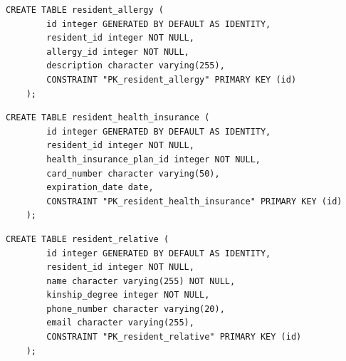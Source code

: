 \begin{quadro}[H]
	\caption[Script SQL --- Tabela \texttt{resident\_allergy}]{Script SQL --- Tabela \texttt{resident\_allergy}}
	\label{quadro:script-resident-allergy}
	
	\begin{minipage}{0.96\textwidth}
		\begin{lstlisting}[style=academic-sql]
	CREATE TABLE resident_allergy (
		id integer GENERATED BY DEFAULT AS IDENTITY,
		resident_id integer NOT NULL,
		allergy_id integer NOT NULL,
		description character varying(255),
		CONSTRAINT "PK_resident_allergy" PRIMARY KEY (id)
	);
		\end{lstlisting}
	\end{minipage}
	
\end{quadro}

\begin{quadro}[H]
	\caption[Script SQL --- Tabela \texttt{resident\_health\_insurance}]{Script SQL --- Tabela \texttt{resident\_health\_insurance}}
	\label{quadro:script-resident-health-insurance}
	
	\begin{minipage}{0.96\textwidth}
		\begin{lstlisting}[style=academic-sql]
	CREATE TABLE resident_health_insurance (
		id integer GENERATED BY DEFAULT AS IDENTITY,
		resident_id integer NOT NULL,
		health_insurance_plan_id integer NOT NULL,
		card_number character varying(50),
		expiration_date date,
		CONSTRAINT "PK_resident_health_insurance" PRIMARY KEY (id)
	);
		\end{lstlisting}
	\end{minipage}
	
\end{quadro}

\begin{quadro}[H]
	\caption[Script SQL --- Tabela \texttt{resident\_relative}]{Script SQL --- Tabela \texttt{resident\_relative}}
	\label{quadro:script-resident-relative}
	
	\begin{minipage}{0.96\textwidth}
		\begin{lstlisting}[style=academic-sql]
	CREATE TABLE resident_relative (
		id integer GENERATED BY DEFAULT AS IDENTITY,
		resident_id integer NOT NULL,
		name character varying(255) NOT NULL,
		kinship_degree integer NOT NULL,
		phone_number character varying(20),
		email character varying(255),
		CONSTRAINT "PK_resident_relative" PRIMARY KEY (id)
	);
		\end{lstlisting}
	\end{minipage}
	
\end{quadro}

